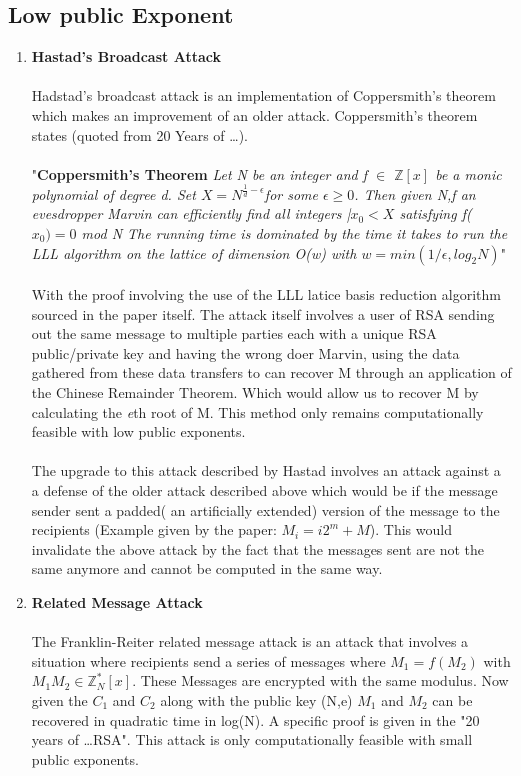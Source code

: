 \documentclass[12pt]{article} %
\begin{document}
\subsection{Low public Exponent}
\begin{enumerate}
\item \textbf{Hastad's Broadcast Attack}
\\\\
Hadstad's broadcast attack is an implementation of Coppersmith's theorem which makes an improvement of an older attack. Coppersmith's theorem states (quoted from 20 Years of \dots).
\\\\
"\textbf{Coppersmith's Theorem} \textit{Let N be an integer and f $ \in $ $\mathbb{Z}[x]$  be a monic polynomial of degree d. Set $X = N^{\frac{1}{d} - \epsilon} $for some $\epsilon \geq 0$. Then given {N,f} an evesdropper Marvin can efficiently find all integers |$x_0 < X$ satisfying f($x_0) = 0$ mod N The running time is dominated by the time it takes to run the LLL algorithm on the lattice of dimension O(w) with $ w = min(1/\epsilon,log_2N)$}"
\\\\
With the proof involving the use of the LLL latice basis reduction algorithm sourced in the paper itself. The attack itself involves a user of RSA sending out the same message to multiple parties each with a unique RSA public/private key and having the wrong doer Marvin, using the data gathered from these data transfers to can recover M through an application of the Chinese Remainder Theorem. Which would allow us to recover M by calculating the \textit{e}th root of M. This method only remains computationally feasible with low public exponents.
\\\\
The upgrade to this attack described by Hastad involves an attack against a a defense of the older attack described above which would be if the message sender sent a padded( an artificially extended) version of the message to the recipients (Example given by the paper: $ M_i = i2^{m}+M$). This would invalidate the above attack by the fact that the messages sent are not the same anymore and cannot be computed in the same way.
\item \textbf{Related Message Attack}
\\\\
The Franklin-Reiter related message attack is an attack that involves a situation where recipients send a series of messages where $M_1 = f(M_2)$ with $M_1M_2 \in \mathbb{Z}^{*}_N[x] $. These Messages are encrypted with the same modulus. Now given the $C_1$ and $C_2$ along with the public key (N,e) $M_1$ and $M_2$ can be recovered in quadratic time in log(N). A specific proof is given in the "20 years of \dots RSA". This attack is only computationally feasible with small public exponents.

\end{enumerate}
\end{document}
